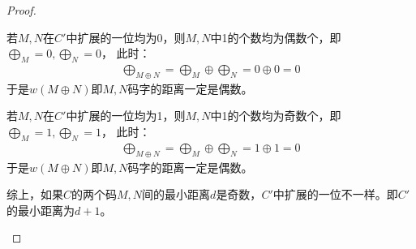 \begin{proof}
\begin{enumerate}
      若$M,N$在$C'$中扩展的一位均为0，则$M,N$中1的个数均为偶数个，即$\bigoplus_M = 0,\bigoplus_N = 0$，
      此时：
      \begin{align*}
         \bigoplus_{M\oplus N} = \bigoplus_M \oplus \bigoplus_N = 0\oplus 0 =0
      \end{align*}
      于是$w(M\oplus N)$即$M,N$码字的距离一定是偶数。

      若$M,N$在$C'$中扩展的一位均为1，则$M,N$中1的个数均为奇数个，即$\bigoplus_M = 1,\bigoplus_N = 1$，
      此时：
      \begin{align*}
         \bigoplus_{M\oplus N} = \bigoplus_M \oplus \bigoplus_N = 1\oplus 1 =0
      \end{align*}
      于是$w(M\oplus N)$即$M,N$码字的距离一定是偶数。

      综上，如果$C$的两个码$M,N$间的最小距离$d$是奇数，$C'$中扩展的一位不一样。即$C'$的最小距离为$d+1$。
   \end{enumerate}
\end{proof}